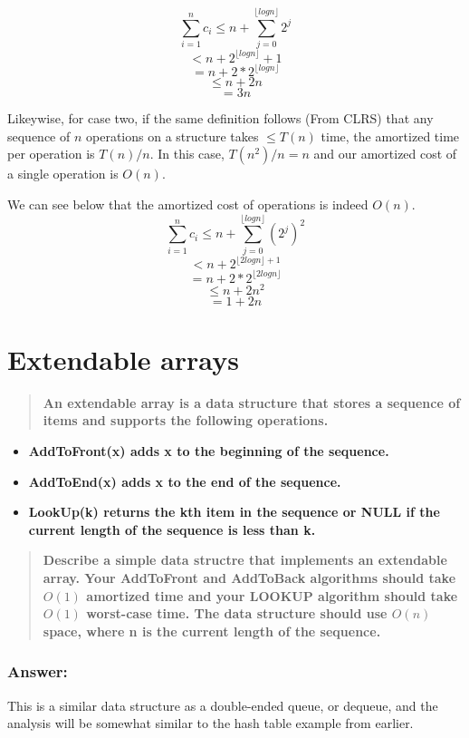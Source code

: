 \documentclass[titlepage]{article}\usepackage[]{graphicx}\usepackage[]{color}
\begin{document}
\[ \sum_{i=1}^n c_i \leq n + \sum_{j=0}^{\lfloor log n \rfloor} 2^j \]
\[ < n + 2^{\lfloor log n \rfloor} +1 \]
\[ = n + 2 * 2^{\lfloor log n \rfloor} \] 
\[\leq n + 2n \]
\[ = 3n \]

Likeywise, for case two, if the same definition follows (From CLRS) that any
sequence of $n$ operations on a structure takes $\leq T(n)$ time, the amortized
time per operation is $T(n)/n$. In this case, $T(n^2)/n = n$ and our amortized
cost of a single operation is $O(n)$. 

We can see below that the amortized cost of operations is indeed $O(n)$.
\[ \sum_{i=1}^n c_i \leq n + \sum_{j=0}^{\lfloor log n \rfloor} (2^j)^2 \]
\[ < n + 2^{ \lfloor 2log n \rfloor +1 }\]
\[ = n + 2 * 2^{\lfloor 2 log n \rfloor} \] 
\[\leq n + 2n^2 \]
\[ = 1 + 2n \]


\section{Extendable arrays}
\begin{quote}
  \textbf{An extendable array is a data structure that stores a sequence of
  items and supports the following operations.}
\end{quote}

\begin{itemize}
  \item \textbf{AddToFront(x) adds x to the beginning of the sequence.}
  \item \textbf{AddToEnd(x) adds x to the end of the sequence.}
  \item \textbf{LookUp(k) returns the kth item in the sequence or NULL if the
	current length of the sequence is less than k. }
\end{itemize}
\begin{quote}
  \textbf{Describe a simple data structre that implements an extendable array.
	Your AddToFront and AddToBack algorithms should take $O(1)$ amortized time
	and your LOOKUP algorithm should take $O(1)$ worst-case time. The data
	structure should use $O(n)$ space, where n is the current length of the
  sequence.}
\end{quote}

\subsubsection{Answer:}
This is a similar data structure as a double-ended queue, or dequeue, and the
analysis will be somewhat similar to the hash table example from earlier. 
\end{document}
